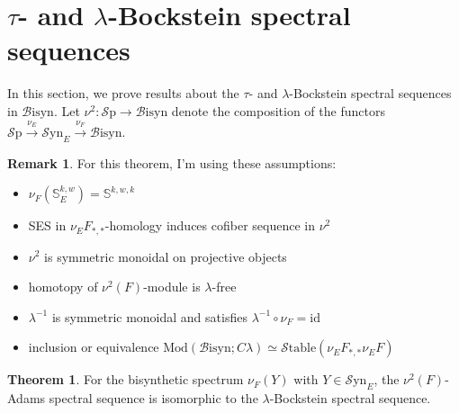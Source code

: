\documentclass[10pt]{amsart}
\theoremstyle{definition}
\numberwithin{figure}{section}
\numberwithin{equation}{section}
\newtheorem{thm}[figure]{Theorem}
\newtheorem{rem}[figure]{Remark}
\theoremstyle{cited}
\newcommand{\Sp}{{\mathcal{S}\mathrm{p}}}
\newcommand{\Mod}{\mathrm{Mod}}
\newcommand{\Syn}{\mathcal{S}\mathrm{yn}}
\newcommand{\Bisyn}{\mathcal{B}\mathrm{isyn}}
\newcommand{\Stable}{\mathcal{S}\mathrm{table}}
\begin{document}
\section{\texorpdfstring{$\tau$- and $\lambda$-Bockstein spectral sequences}{Tau- and Lambda-Bockstein spectral sequences}}

In this section, we prove results about the $\tau$- and $\lambda$-Bockstein spectral sequences in $\Bisyn$. Let $\nu^2:\Sp\to\Bisyn$ denote the composition of the functors $\Sp\xrightarrow{\nu_E}\Syn_E\xrightarrow{\nu_F}\Bisyn$.

\begin{rem}
For this theorem, I'm using these assumptions:
\begin{itemize}
\item $\nu_F(\mathbb{S}^{k,w}_E) = \mathbb{S}^{k,w,k}$
\item SES in $\nu_EF_{*,*}$-homology induces cofiber sequence in $\nu^2$
\item $\nu^2$ is symmetric monoidal on projective objects
\item homotopy of $\nu^2(F)$-module is $\lambda$-free
\item $\lambda^{-1}$ is symmetric monoidal and satisfies $\lambda^{-1}\circ\nu_F=\mathrm{id}$
\item inclusion or equivalence $\Mod(\Bisyn;C\lambda)\simeq\Stable(\nu_EF_{*,*}\nu_EF)$
\end{itemize}
\end{rem}

\begin{thm}
    For the bisynthetic spectrum $\nu_F(Y)$ with $Y\in\Syn_E$, the $\nu^2(F)$-Adams spectral sequence is isomorphic to the $\lambda$-Bockstein spectral sequence. 
\end{thm}
\end{document}
